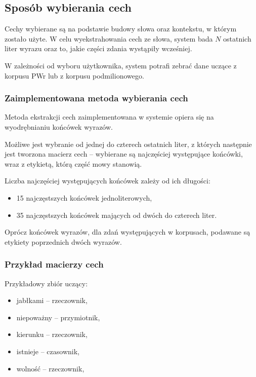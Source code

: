 	\subsection{Sposób wybierania cech}
	Cechy wybierane są na podstawie budowy słowa oraz kontekstu, w którym zostało użyte.
	W celu wyekstrahowania cech ze słowa, system bada $N$ ostatnich liter wyrazu oraz to, jakie części zdania wystąpiły wcześniej.
	
	W zależności od wyboru użytkownika, system potrafi zebrać dane uczące z korpusu PWr lub z korpusu podmilionowego.
	
	\subsubsection{Zaimplementowana metoda wybierania cech}
	Metoda ekstrakcji cech zaimplementowana w systemie opiera się na wyodrębnianiu końcówek wyrazów.
	
	Możliwe jest wybranie od jednej do czterech ostatnich liter, z których następnie jest tworzona macierz cech -- wybierane są najczęściej występujące końcówki, wraz z etykietą, którą część mowy stanowią.
	
	Liczba najczęściej występujących końcówek zależy od ich długości:
	\begin{itemize}
		\item 15 najczęstszych końcówek jednoliterowych,
		\item 35 najczęstszych końcówek mających od dwóch do czterech liter.
	\end{itemize}
	
	Oprócz końcówek wyrazów, dla zdań występujących w korpusach, podawane są etykiety poprzednich dwóch wyrazów.
	
	\subsubsection{Przykład macierzy cech}
	Przykładowy zbiór uczący:
	\begin{itemize}
		\item jabłkami -- rzeczownik,
		\item niepoważny -- przymiotnik,
		\item kierunku -- rzeczownik,
		\item istnieje -- czasownik,
		\item wolność -- rzeczownik,
	\end{itemize}
	
